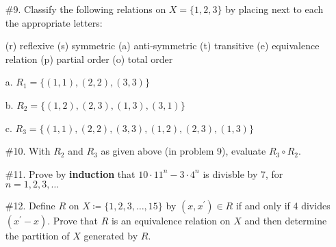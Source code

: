 \documentclass[10pt,letterpaper]{article}
\begin{document}
\newpage{}
{

\begin{enumerate}
	\item[\#9.] Classify the following relations on $X = \{ 1, 2, 3 \}$ by placing next to each the appropriate letters:
	\begin{center}(r) reflexive  (s) symmetric  (a) anti-symmetric  (t) transitive  (e) equivalence relation  (p) partial order  (o) total order
	\end{center}
\vspace{.5em}

a. $R_{1} = \{ (1,1) , (2,2) , (3,3) \}$

b. $R_{2} = \{ (1,2) , (2,3) , (1,3), (3,1) \}$

c. $R_{3} = \{ (1,1) , (2,2) , (3,3), (1,2), (2,3), (1,3)\}$

\item[\#10.] With $R_{2}$ and $R_{3}$ as given above (in problem 9), evaluate $R_{3} \circ R_{2}$.
\vspace{4em}

\item[\#11.] Prove by \textbf{induction} that $10\cdot11^{n} -3\cdot4^{n}$ is divisble by 7, for $n = 1, 2, 3, \dots$
\vspace{17em}

\item[\#12.] Define $R$ on $X \coloneqq \{1,2,3,\dots, 15\}$ by $(x,x^{\prime}) \in R$ if and only if 4 divides $(x^{\prime} - x)$. Prove that $R$ is an equivalence relation on $X$ and then determine the partition of $X$ generated by $R$.
\end{enumerate}



}
\end{document}
